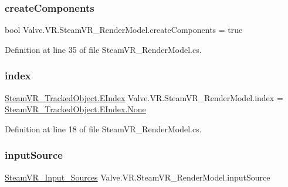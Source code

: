 \subsubsection{\texorpdfstring{createComponents}{createComponents}}
{\footnotesize\ttfamily bool Valve.\+V\+R.\+Steam\+V\+R\+\_\+\+Render\+Model.\+create\+Components = true}



Definition at line 35 of file Steam\+V\+R\+\_\+\+Render\+Model.\+cs.

\mbox{\label{class_valve_1_1_v_r_1_1_steam_v_r___render_model_af732541e751210a72fd7ea793566d940}} 
\subsubsection{\texorpdfstring{index}{index}}
{\footnotesize\ttfamily \mbox{\hyperlink{class_valve_1_1_v_r_1_1_steam_v_r___tracked_object_a3d437894eff0bfc81eeb21a8c478413e}{Steam\+V\+R\+\_\+\+Tracked\+Object.\+E\+Index}} Valve.\+V\+R.\+Steam\+V\+R\+\_\+\+Render\+Model.\+index = \mbox{\hyperlink{class_valve_1_1_v_r_1_1_steam_v_r___tracked_object_a3d437894eff0bfc81eeb21a8c478413ea6adf97f83acf6453d4a6a4b1070f3754}{Steam\+V\+R\+\_\+\+Tracked\+Object.\+E\+Index.\+None}}}



Definition at line 18 of file Steam\+V\+R\+\_\+\+Render\+Model.\+cs.

\mbox{\label{class_valve_1_1_v_r_1_1_steam_v_r___render_model_a97f12235b76af906c2d2cd83dce06785}} 
\subsubsection{\texorpdfstring{inputSource}{inputSource}}
{\footnotesize\ttfamily \mbox{\hyperlink{namespace_valve_1_1_v_r_a82e5bf501cc3aa155444ee3f0662853f}{Steam\+V\+R\+\_\+\+Input\+\_\+\+Sources}} Valve.\+V\+R.\+Steam\+V\+R\+\_\+\+Render\+Model.\+input\+Source\hspace{0.3cm}{\ttfamily [protected]}}



